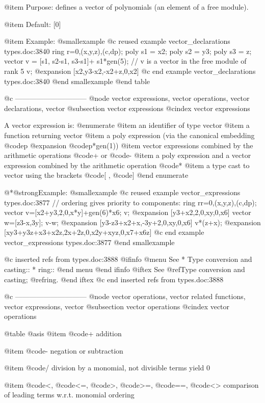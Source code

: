 {{{{{{@item Purpose:
defines a vector of polynomials (an element of a free module).

@item Default:
[0]

@item Example:
@smallexample
@c reused example vector_declarations types.doc:3840 
  ring r=0,(x,y,z),(c,dp);
  poly s1 = x2;
  poly s2 = y3;
  poly s3 = z;
  vector v = [s1, s2-s1, s3-s1]+ s1*gen(5);
  // v is a vector in the free module of rank 5
  v;
@expansion{} [x2,y3-x2,-x2+z,0,x2]
@c end example vector_declarations types.doc:3840
@end smallexample
@end table

@c ------------------------------
@node vector expressions, vector operations, vector declarations, vector
@subsection vector expressions
@cindex vector expressions

A vector expression is:
@enumerate
@item
an identifier of type vector
@item
a function returning vector
@item
a poly expression (via the canonical embedding @code{p} @expansion{} @code{p*gen(1)})
@item
vector expressions combined by the arithmetic operations @code{+} or
@code{-}
@item
a poly expression and a vector expression combined by the arithmetic
operation @code{*}
@item
a type cast to vector using the brackets @code{[} , @code{]}
@end enumerate

@*@strong{Example:}
@smallexample
@c reused example vector_expressions types.doc:3877 
  // ordering gives priority to components:
  ring rr=0,(x,y,z),(c,dp);
  vector v=[x2+y3,2,0,x*y]+gen(6)*x6;
  v;
@expansion{} [y3+x2,2,0,xy,0,x6]
  vector w=[z3-x,3y];
  v-w;
@expansion{} [y3-z3+x2+x,-3y+2,0,xy,0,x6]
  v*(z+x);
@expansion{} [xy3+y3z+x3+x2z,2x+2z,0,x2y+xyz,0,x7+x6z]
@c end example vector_expressions types.doc:3877
@end smallexample

@c inserted refs from types.doc:3888
@ifinfo
@menu
See
* Type conversion and casting::
* ring::
@end menu
@end ifinfo
@iftex
See
@ref{Type conversion and casting};
@ref{ring}.
@end iftex
@c end inserted refs from types.doc:3888

@c ------------------------------
@node vector operations, vector related functions, vector expressions, vector
@subsection vector operations
@cindex vector operations

@table @asis
@item @code{+}
addition

@item @code{-}
negation or subtraction

@item @code{/}
division by a monomial, not divisible terms yield 0

@item @code{<}, @code{<=}, @code{>}, @code{>=}, @code{==}, @code{<>}
comparison of leading terms w.r.t. monomial ordering

}}}}}}

